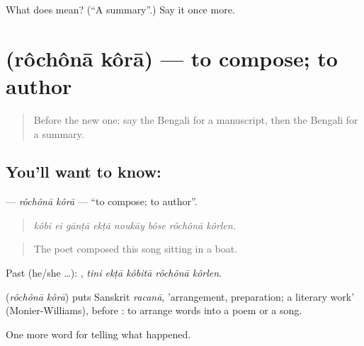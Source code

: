 \begin{tcolorbox}[breakable,colback=teal!4,colframe=teal!35!black,title={Before you move on}]
What does  mean? (\textquotedblleft{}A summary\textquotedblright{}.) Say it once more.
\end{tcolorbox}
\section[\texorpdfstring{\bn{রচনা} \bn{করা} (rôchônā kôrā)}{রচনা করা (rôchônā kôrā)}]{  (rôchônā kôrā) — to compose; to author}

\label{lesson:BN-C328-rochona-kora}



\begin{quote}
Before the new one: say the Bengali for a manuscript, then the Bengali for a summary.
\end{quote}

\subsection*{You'll want to know:  }
\textbf{ } — \emph{rôchônā kôrā} — \textquotedblleft{}to compose; to author\textquotedblright{}.

\begin{quote}
       
\end{quote}

\begin{quote}
\emph{kôbi ei gānṭā ekṭā noukāy bôse rôchônā kôrlen.}
\end{quote}

\begin{quote}
The poet composed this song sitting in a boat.
\end{quote}

Past (he/she …):     , \emph{tini ekṭā kôbitā rôchônā kôrlen}.

\begin{cousinweb}
\textbf{ } (\emph{rôchônā kôrā}) puts Sanskrit \emph{racanā}, 'arrangement, preparation; a literary work' (Monier-Williams), before : to arrange words into a poem or a song.
\end{cousinweb}

\begin{grammarlens}[title={What you've built}]
One more word for telling what happened.
\end{grammarlens}

